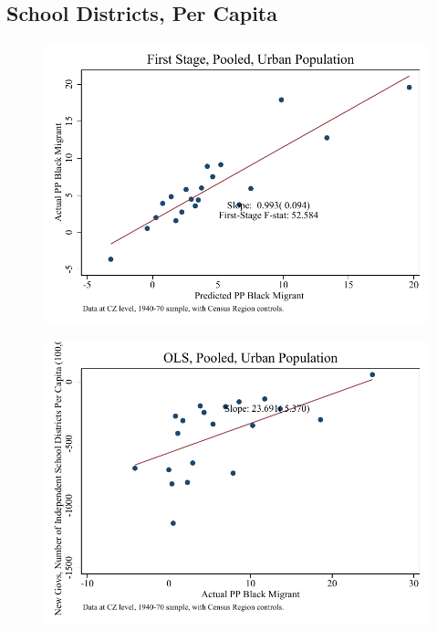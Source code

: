\documentclass{article}
\begin{document}
\subsection{School Districts, Per Capita}

\clearpage
\begin{figure}
\centering
\includegraphics{figures/simplefigs/pooled_schdist_ind_pc_C3_urban_fs.pdf}
\end{figure}
\clearpage
\begin{figure}
\centering
\includegraphics{figures/simplefigs/pooled_schdist_ind_pc_C3_urban_ols.pdf}
\end{figure}
\clearpage
\end{document}
